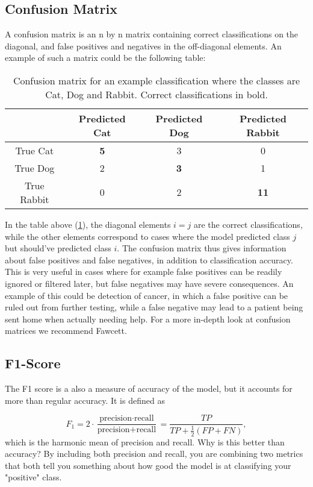 \subsection{Confusion Matrix}
A confusion matrix is an n by n matrix containing correct classifications
on the diagonal, and false positives and negatives in the off-diagonal elements.
An example of such a matrix could be the following table:
\begin{table}[h]
    \centering
    \begin{tabular}{c|c|c|c}
     & Predicted Cat & Predicted Dog & Predicted Rabbit \\
    \hline
    True Cat & \textbf{5} & 3 & 0 \\
    \hline
    True Dog & 2 & \textbf{3} & 1 \\
    \hline
    True Rabbit & 0 & 2 & \textbf{11} \\
\end{tabular}
\caption{Confusion matrix for an example classification where the classes
         are Cat, Dog and Rabbit. Correct classifications in bold.}
\label{tab:confmat-example}
\end{table}
In the table above (\ref{tab:confmat-example}), the diagonal elements
$i = j$ are the correct classifications, while the other elements correspond
to cases where the model predicted class $j$ but should've predicted class $i$.
The confusion matrix thus gives information about false positives and false
negatives, in addition to classification accuracy. This is very useful
in cases where for example false positives can be readily ignored or filtered
later, but false negatives may have severe consequences. An example of this
could be detection of cancer, in which a false positive can be ruled out
from further testing, while a false negative may lead to a patient being sent
home when actually needing help. For a more in-depth look at confusion matrices
we recommend Fawcett\cite{Fawcett2006}.

\subsection{F1-Score}
The F1 score is a also a measure of accuracy of the model, but it accounts for more 
than regular accuracy. It is defined as

$$F_1 = 2 \cdot \frac{\text{precision} \cdot \text{recall}}{\text{precision} + \text{recall}} = \frac{TP}{TP + \tfrac{1}{2}(FP + FN)},$$
which is the harmonic mean of precision and recall. Why is this better than accuracy? 
By including both precision and recall, you are combining two metrics that both tell 
you something about how good the model is at classifying your "positive" class.

